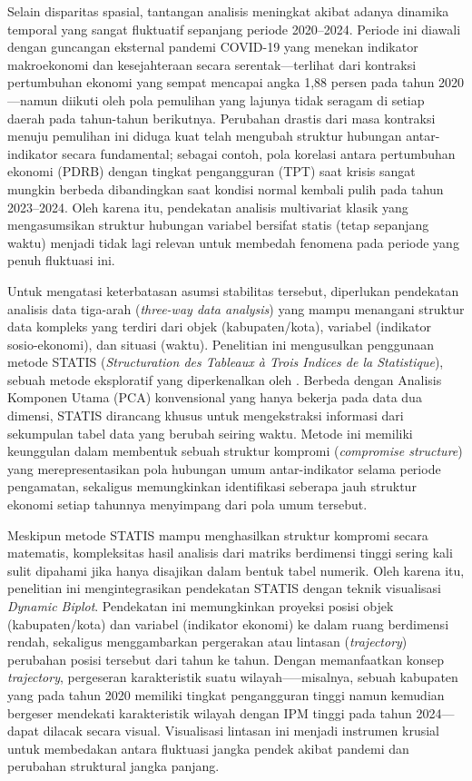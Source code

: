 \documentclass[a4paper]{article}
\theoremstyle{definition} %
\begin{document}
Selain disparitas spasial, tantangan analisis meningkat akibat adanya dinamika temporal yang sangat fluktuatif sepanjang periode 2020--2024. Periode ini diawali dengan guncangan eksternal pandemi COVID-19 yang menekan indikator makroekonomi dan kesejahteraan secara serentak—terlihat dari kontraksi pertumbuhan ekonomi yang sempat mencapai angka 1,88 persen pada tahun 2020 \citep{bpspdrb}—namun diikuti oleh pola pemulihan yang lajunya tidak seragam di setiap daerah pada tahun-tahun berikutnya. Perubahan drastis dari masa kontraksi menuju pemulihan ini diduga kuat telah mengubah struktur hubungan antar-indikator secara fundamental; sebagai contoh, pola korelasi antara pertumbuhan ekonomi (PDRB) dengan tingkat pengangguran (TPT) saat krisis sangat mungkin berbeda dibandingkan saat kondisi normal kembali pulih pada tahun 2023--2024. Oleh karena itu, pendekatan analisis multivariat klasik yang mengasumsikan struktur hubungan variabel bersifat statis (tetap sepanjang waktu) menjadi tidak lagi relevan untuk membedah fenomena pada periode yang penuh fluktuasi ini.

Untuk mengatasi keterbatasan asumsi stabilitas tersebut, diperlukan pendekatan analisis data tiga-arah (\textit{three-way data analysis}) yang mampu menangani struktur data kompleks yang terdiri dari objek (kabupaten/kota), variabel (indikator sosio-ekonomi), dan situasi (waktu). Penelitian ini mengusulkan penggunaan metode STATIS (\textit{Structuration des Tableaux à Trois Indices de la Statistique}), sebuah metode eksploratif yang diperkenalkan oleh \citep{lavit94,oliveira2024}. Berbeda dengan Analisis Komponen Utama (PCA) konvensional yang hanya bekerja pada data dua dimensi, STATIS dirancang khusus untuk mengekstraksi informasi dari sekumpulan tabel data yang berubah seiring waktu. Metode ini memiliki keunggulan dalam membentuk sebuah struktur kompromi (\textit{compromise structure}) yang merepresentasikan pola hubungan umum antar-indikator selama periode pengamatan, sekaligus memungkinkan identifikasi seberapa jauh struktur ekonomi setiap tahunnya menyimpang dari pola umum tersebut.

Meskipun metode STATIS mampu menghasilkan struktur kompromi secara matematis, kompleksitas hasil analisis dari matriks berdimensi tinggi sering kali sulit dipahami jika hanya disajikan dalam bentuk tabel numerik. Oleh karena itu, penelitian ini mengintegrasikan pendekatan STATIS dengan teknik visualisasi \textit{Dynamic Biplot}. Pendekatan ini memungkinkan proyeksi posisi objek (kabupaten/kota) dan variabel (indikator ekonomi) ke dalam ruang berdimensi rendah, sekaligus menggambarkan pergerakan atau lintasan (\textit{trajectory}) perubahan posisi tersebut dari tahun ke tahun. Dengan memanfaatkan konsep \textit{trajectory}, pergeseran karakteristik suatu wilayah—--misalnya, sebuah kabupaten yang pada tahun 2020 memiliki tingkat pengangguran tinggi namun kemudian bergeser mendekati karakteristik wilayah dengan IPM tinggi pada tahun 2024---dapat dilacak secara visual. Visualisasi lintasan ini menjadi instrumen krusial untuk membedakan antara fluktuasi jangka pendek akibat pandemi dan perubahan struktural jangka panjang.
\end{document}
